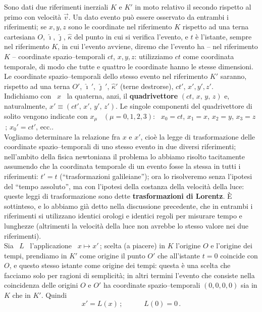 Sono dati due riferimenti inerziali $K$ e $K'$ in moto relativo il secondo
rispetto al primo con velocit\`a $\vec v$. Un dato evento pu\`o essere osservato
da entrambi i riferimenti; se $x,y,z$ sono le coordinate nel riferimento $K$
rispetto ad una terna cartesiana $O$, $\hat\imath$, $\hat\jmath$, $\hat\kappa$
del punto in cui si verifica l'evento, e $t$ \`e l'istante, sempre nel
riferimento $K$, in cui l'evento avviene, diremo che l'evento ha -- nel
riferimento $K$ -- coordinate spazio--temporali $ct$, $x,y,z$: utilizziamo $ct$
come coordinata temporale, di modo che tutte e quattro le coordinate hanno le
stesse dimensioni. Le coordinate spazio--temporali dello stesso evento nel
riferimento $K'$ saranno, rispetto ad una terna $O'$, $\hat\imath\,'$,
$\hat\jmath\,'$, $\hat\kappa'$ (terne destrorse), $ct'$, $x',y',z'$.\\
Indichiamo con \ $x$ \ la quaterna, anzi, il \textbf{quadrivettore}
$(ct,\,x,\,y,\,z)$ e, naturalmente, $x'\equiv(ct',\,x',\,y',\,z')$. Le singole
componenti del quadrivettore di solito vengono indicate con $x_\mu$
\ $(\mu=0,1,2,3)$: \ $x_0=ct$, $x_1=x$, $x_2=y$, $x_3=z$\,; \quad $x_0'=ct'$,
ecc..\\
Vogliamo determinare la relazione fra $x$ e $x'$, cio\`e la legge di
trasformazione delle coordinate spazio--temporali di uno stesso evento in due
diversi riferimenti; nell'ambito della fisica newtoniana il problema lo abbiamo
risolto tacitamente assumendo che la coordinata temporale di un evento fosse la
stessa in tutti i riferimenti: $t'=t$ (``trasformazioni galileiane''); ora lo
risolveremo senza l'ipotesi del ``tempo assoluto'', ma con l'ipotesi della
costanza della velocit\`a della luce: queste leggi di trasformazione sono dette
\textbf{trasformazioni di Lorentz}. \`E sottinteso, e lo abbiamo gi\`a detto
nella discussione precedente, che in entrambi i riferimenti si utilizzano
identici orologi e identici regoli per misurare tempo e lunghezze (altrimenti la
velocit\`a della luce non avrebbe lo stesso valore nei due riferimenti).\\
Sia \ $L$ \ l'applicazione \ $x\mapsto x'$\,; scelta (a piacere) in $K$
l'origine $O$ e l'origine dei tempi, prendiamo in $K'$ come origine il punto
$O'$ che all'istante $t=0$ coincide con $O$, e questo stesso istante come
origine dei tempi: questa \`e una scelta che facciamo solo per ragioni di
semplicit\`a; in altri termini l'evento che consiste nella coincidenza delle
origini $O$ e $O'$ ha coordinate spazio--temporali $(0,0,0,0)$ sia in $K$ che in
$K'$. Quindi
\begin{equation}
  x'=L(x)\,;\qquad\quad L(0)=0\,.
  \tag{4.13}
\end{equation}
